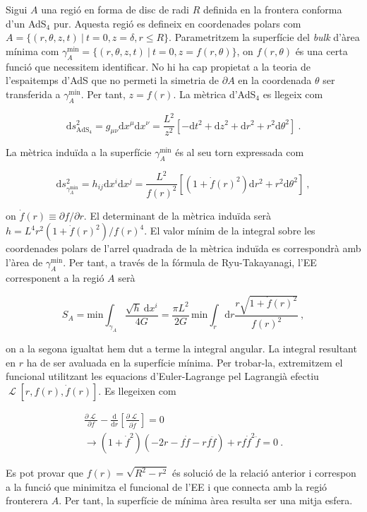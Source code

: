 \documentclass[twocolumn]{revtex4}
\providecommand{\eq}[2]{
    \begin{equation}
        #2
    \label{eq:#1}
    \end{equation}
}
\providecommand{\eqgat}[2]{
    \begin{gather}
        #2
    \label{eq:#1}
    \end{gather}
}
\DeclareMathOperator{\calL}{\mathcal{L}}
\begin{document}
Sigui $A$ una regió en forma de disc de radi $R$ definida en la frontera conforma d'un AdS$_4$ pur. Aquesta regió es defineix en coordenades polars com
$
A = \{ ( r, \theta, z, t ) \ | \ t = 0, z = \delta, r \le R \}
$.
Parametritzem la superfície del \emph{bulk} d'àrea mínima com
$
\gamma_A^\text{min} = \{ ( r, \theta, z, t ) \ | \ t = 0, z = f (r, \theta) \} 
$,
on $f(r,\theta)$ és una certa funció que necessitem identificar. No hi ha cap propietat a la teoria de l'espaitemps d'AdS que no permeti la simetria de $\partial A$ en la coordenada $\theta$ ser transferida a $\gamma_A^\text{min}$. Per tant, $z=f(r)$.
La mètrica d'AdS$_4$ es llegeix com
\eq{1Ametric}{
\mathrm{d}s^2_{\text{AdS}_4} = g_{\mu \nu} \mathrm{d}x^\mu \mathrm{d}x^\nu =
\frac{L^2}{z^2} [ -\mathrm{d}t^2 + \mathrm{d}z^2 + \mathrm{d}r^2 + r^2 \mathrm{d}\theta^2 ] \ . \nonumber
}
La mètrica induïda a la superfície $\gamma_A^\text{min}$ és al seu torn expressada com
\eq{1gammaAmetric}{
\mathrm{d}s^2_{\gamma_A^\text{min}} = h_{i j} \mathrm{d}x^i \mathrm{d}x^j =
\frac{L^2}{f(r)^2} \left[ \left( 1+ \dot{f}(r)^2 \right) \mathrm{d}r^2 + r^2 \mathrm{d}\theta^2 \right] \ , \nonumber
}
on $ \dot{f}(r) \equiv \partial f/\partial r$. El determinant de la mètrica induïda serà
$
h = L^4 r^2 ( 1 + \dot{f}(r)^2 )/f(r)^4
$.
El valor mínim de la integral sobre les coordenades polars de l'arrel quadrada de la mètrica induïda es correspondrà amb l'àrea de $\gamma_A^\text{min}$. Per tant, a través de la fórmula de Ryu-Takayanagi, l'EE corresponent a la regió $A$ serà
\eq{1EEA}{
S_A = \text{min} \int_{\gamma_A} \frac{\sqrt{h} \ \mathrm{d}x^i}{4G} = \frac{\pi L^2}{2G} \, \text{min} \int_r \mathrm{d}r \frac{r \sqrt{ 1 + \dot{f}(r)^2 }}{f(r)^2} \ ,\nonumber
}
on a la segona igualtat hem dut a terme la integral angular. La integral resultant en $r$ ha de ser avaluada en la superfície mínima. Per trobar-la, extremitzem el funcional utilitzant les equacions d'Euler-Lagrange pel Lagrangià efectiu $\calL [r,f(r),\dot{f}(r)]$. Es llegeixen com
\eqgat{1EL}{
\frac{\partial \calL}{\partial f} - \frac{\mathrm{d}}{\mathrm{d}r} \left[ \frac{\partial \calL}{\partial \dot{f}} \right] = 0 \nonumber \\
\longrightarrow \left( 1+\dot{f}^2 \right) \left( -2r-f\dot{f}-rf\ddot{f} \right) + rf\dot{f}^2\ddot{f} = 0 \ .\nonumber
}
Es pot provar que $f(r) = \sqrt{R^2 - r^2}$ és solució de la relació anterior i correspon a la funció que minimitza el funcional de l'EE i que connecta amb la regió fronterera $A$. Per tant, la superfície de mínima àrea resulta ser una mitja esfera.
\end{document}
